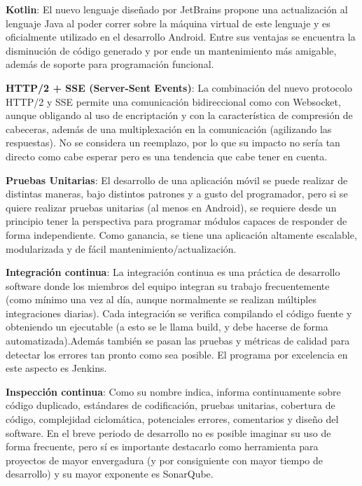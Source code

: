 \newpage

\textbf{Kotlin}\cite{kotlin}: El nuevo lenguaje diseñado por JetBrains propone una actualización al lenguaje Java al poder correr sobre la máquina virtual de este lenguaje y es oficialmente utilizado en el desarrollo Android. Entre sus ventajas se encuentra la disminución de código generado y por ende un mantenimiento más amigable, además de soporte para programación funcional.

\textbf{HTTP/2 + SSE (Server-Sent Events)}\cite{http2sse}: La combinación del nuevo protocolo HTTP/2 y SSE permite una comunicación bidireccional como con Websocket, aunque obligando al uso de encriptación y con la característica de compresión de cabeceras, además de una multiplexación en la comunicación (agilizando las respuestas). No se considera un reemplazo, por lo que su impacto no sería tan directo como cabe esperar pero es una tendencia que cabe tener en cuenta.

\textbf{Pruebas Unitarias}\cite{unittest}: El desarrollo de una aplicación móvil se puede realizar de distintas maneras, bajo distintos patrones y a gusto del programador, pero si se quiere realizar pruebas unitarias (al menos en Android), se requiere desde un principio tener la perspectiva para programar módulos capaces de responder de forma independiente. Como ganancia, se tiene una aplicación altamente escalable, modularizada y de fácil mantenimiento/actualización.

\textbf{Integración continua}: La integración continua es una práctica de desarrollo software donde los miembros del equipo integran su trabajo frecuentemente (como mínimo una vez al día, aunque normalmente se realizan múltiples integraciones diarias).
Cada integración se verifica compilando el código fuente y obteniendo un ejecutable (a esto se le llama build, y debe hacerse de forma automatizada).Además también se pasan las pruebas y métricas de calidad para detectar los errores tan pronto como sea posible. El programa por excelencia en este aspecto es Jenkins\cite{jenkins}.

\newpage

\textbf{Inspección continua}: Como su nombre indica, informa continuamente sobre código duplicado, estándares de codificación, pruebas unitarias, cobertura de código, complejidad ciclomática, potenciales errores, comentarios y diseño del software. En el breve periodo de desarrollo no es posible imaginar su uso de forma frecuente, pero sí es importante destacarlo como herramienta para proyectos de mayor envergadura (y por consiguiente con mayor tiempo de desarrollo) y su mayor exponente es SonarQube\cite{sonarqube}.

